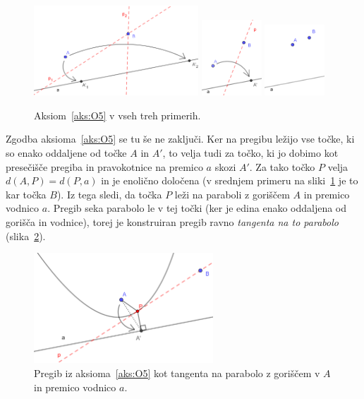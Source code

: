\begin{figure}[h]
    \centering
    \includegraphics[width=0.55\textwidth]{images/origami_aksiomi/O5a.png}
    \includegraphics[width=0.2\textwidth]{images/origami_aksiomi/O5b.png}
    \includegraphics[width=0.2\textwidth]{images/origami_aksiomi/O5c.png}
    \caption[Aksiom~\ref{aks:O5}]{Aksiom~\ref{aks:O5} v vseh treh primerih.}
    \label{fig:O5}
\end{figure}

Zgodba aksioma~\ref{aks:O5} se tu še ne zaključi. Ker na pregibu ležijo vse točke, ki so enako oddaljene od točke $A$ in $A'$, to velja tudi za točko, ki jo dobimo kot presečišče pregiba in pravokotnice na premico $a$ skozi $A'$. Za tako točko $P$ velja $ d(A,P) = d(P,a) $ in je enolično določena (v srednjem primeru na sliki~\ref{fig:O5} je to kar točka $B$). Iz tega sledi, da točka $P$ leži na paraboli z goriščem $A$ in premico vodnico $a$. Pregib seka parabolo le v tej točki (ker je edina enako oddaljena od gorišča in vodnice), torej je konstruiran pregib ravno \emph{tangenta na to parabolo} (slika~\ref{fig:O5_parabola}).

\begin{figure}[h]
    \centering
    \includegraphics[width=0.6\textwidth]{images/origami_aksiomi/O5_parabola.png}
    \caption[Tangenta na parabolo]{Pregib iz aksioma~\ref{aks:O5} kot tangenta na parabolo z goriščem v $A$ in premico vodnico $a$.}
    \label{fig:O5_parabola}
\end{figure}

